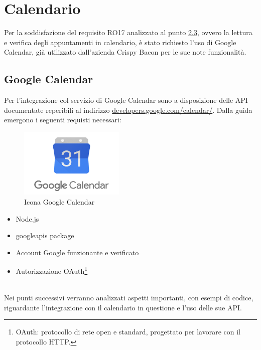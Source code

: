 \newpage
\section{Calendario}
Per la soddisfazione del requisito RO17 analizzato al punto \hyperref[requisti-richiesti]{2.3}, ovvero la lettura e verifica degli appuntamenti in calendario, è stato richiesto l'uso di Google Calendar, già utilizzato dall'azienda Crispy Bacon per le sue note funzionalità. 
\subsection{Google Calendar}
Per l’integrazione col servizio di Google Calendar sono a disposizione delle API documentate reperibili al indirizzo \href{https://developers.google.com/calendar/}{developers.google.com/calendar/}. Dalla guida emergono i seguenti requisti necessari:\\
\begin{minipage}{0.5\textwidth}
	\begin{figure}[H]
		\includegraphics[width=5cm]{immagini/google_calendar.png}
		\caption{\label{fig:icona_google_calendar}Icona Google Calendar}
	\end{figure}
\end{minipage}
\begin{minipage}{0.5\textwidth}
	\begin{itemize}
		\item Node.js
    	\item googleapis package
    	\item Account Google funzionante e verificato
    	\item Autorizzazione OAuth\footnote{OAuth: protocollo di rete open e standard, progettato per lavorare con il protocollo HTTP.}
	\end{itemize}
\end{minipage}
\\[0.5cm]
Nei punti successivi verranno analizzati aspetti importanti, con esempi di codice, riguardante l'integrazione con il calendario in questione e l’uso delle sue API.
